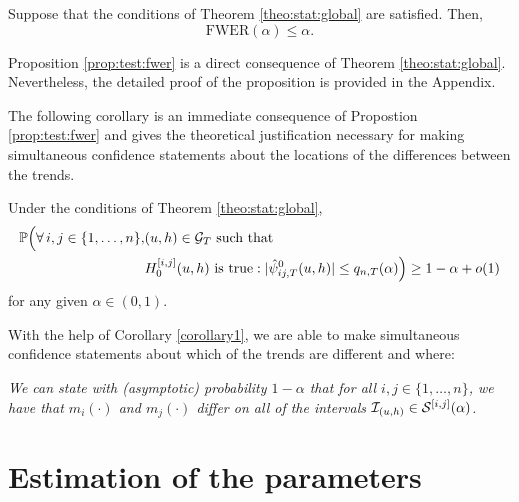\documentclass[a4paper,12pt]{article}
\begin{document}
\begin{prop}\label{prop:test:fwer}
Suppose that the conditions of Theorem \ref{theo:stat:global} are satisfied. Then,
$$ \text{FWER}(\alpha) \leq \alpha.$$
\end{prop}
Proposition \ref{prop:test:fwer} is a direct consequence of Theorem \ref{theo:stat:global}. Nevertheless, the detailed proof of the proposition is provided in the 
Appendix. 

The following corollary is an immediate consequence of Propostion \ref{prop:test:fwer} and gives the theoretical justification necessary for making simultaneous confidence statements about the locations of the differences between the trends.

\begin{corollaryA}\label{corollary1}
Under the conditions of Theorem \ref{theo:stat:global}, 
\begin{align*}\mathbb{P}\Big( \forall \, i,j \in \{1, \ldots, n\}, &(u, h) \in \mathcal{G}_T \text{ such that }\\
&H_0^{[i, j]}(u, h) \text{ is true}: |\hat{\psi}^0_{ij,T}(u, h)| \le q_{n,T}(\alpha) \Big) \ge 1 - \alpha + o(1)
\end{align*}
for any given $\alpha \in (0,1)$.   
\end{corollaryA} 


With the help of Corollary \ref{corollary1}, we are able to make simultaneous confidence statements about which of the trends are different and where:

\begin{center}
\begin{minipage}[c][1.75cm][c]{13cm}
\textit{We can state with (asymptotic) probability $1-\alpha$ that for all \linebreak $i, j \in \{1,\ldots, n\}$, we have that $m_i(\cdot)$ and $m_j(\cdot)$ differ on all of the intervals $\mathcal{I}_{(u, h)} \in \mathcal{S}^{[i, j]}(\alpha)$.}
\end{minipage}
\end{center}



\section{Estimation of the parameters}\label{sec:para}
\end{document}

